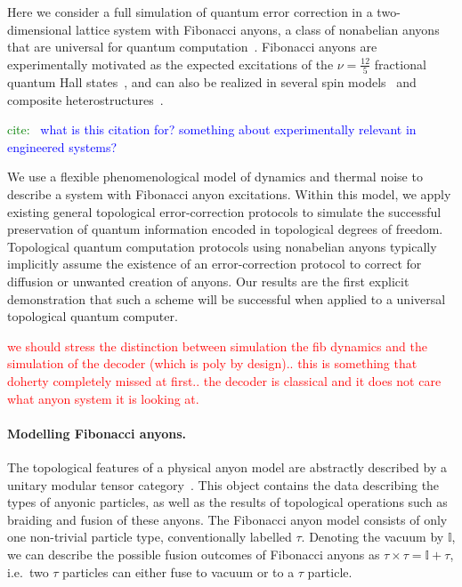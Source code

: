 \documentclass[aps, prl, letterpaper, twocolumn, superscriptaddress, notitlepage, 10pt]{revtex4-1}
\newcommand{\cggb}[1]{\textcolor{blue}{#1}}
\newcommand{\dude}[1]{\textcolor{red}{#1}}
\newcommand{\stf}[1]{\textcolor{green}{#1}}
\begin{document}
Here we consider a full simulation of quantum error correction in a two-dimensional lattice 
system with Fibonacci anyons, a class of nonabelian anyons that are universal for quantum 
computation~\cite{Freedman2002, Nayak2008}. Fibonacci anyons are experimentally motivated as the 
expected excitations of the $\nu=\frac{12}{5}$ fractional quantum Hall 
states~\cite{Slingerland2001}, and can also be realized in several spin 
models~\cite{Levin2005, Kapit2013, Palumbo2014} and composite 
heterostructures~\cite{Mong2014}.

\stf{cite:~\cite{Bonesteel2012}} \cggb{what is this citation for? something about experimentally relevant in engineered systems?}

We use a flexible phenomenological model of dynamics and thermal noise to describe a system with Fibonacci anyon excitations. Within this model, we apply existing general topological error-correction protocols to simulate the successful preservation of quantum information encoded in topological degrees of freedom. Topological quantum computation protocols using nonabelian anyons typically implicitly assume the existence of an error-correction protocol to correct for diffusion or unwanted creation of anyons. Our results are the first explicit demonstration that such a scheme will be successful when applied to a universal topological quantum computer.

\dude{we should stress the distinction between
simulation the fib dynamics and the simulation of
the decoder (which is poly by design).. this is something
that doherty completely missed at first.. the decoder is
classical and it does not care what anyon system it is
looking at.}

\paragraph{Modelling Fibonacci anyons.}

The topological features of a physical anyon model are abstractly described by a unitary 
modular tensor category~\cite{Wang2010b}. This object contains the data describing the 
types of anyonic particles, as well as the results of topological operations such as braiding and 
fusion of these anyons. The Fibonacci anyon model consists of only one non-trivial particle 
type, conventionally labelled $\tau$. Denoting the vacuum by $\mathbb{I}$, we can describe 
the possible fusion outcomes of Fibonacci anyons as $\tau\times\tau=\mathbb{I}+\tau$, 
i.e.~two $\tau$ particles can either fuse to vacuum or to a $\tau$ particle.
\end{document}
